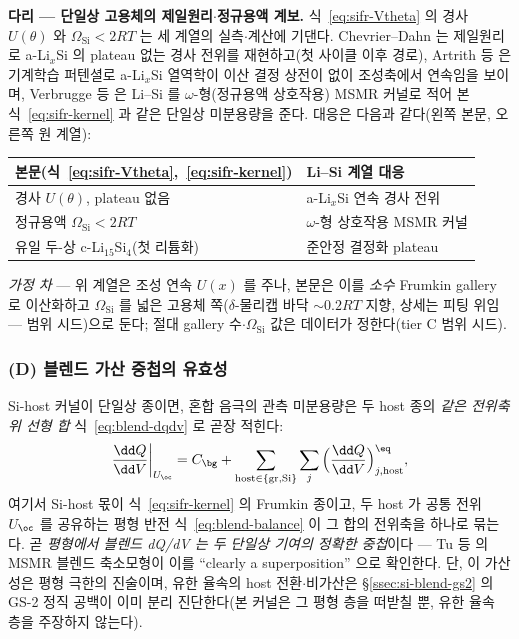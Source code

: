 \begin{srcbox}
\textbf{다리 --- 단일상 고용체의 제일원리$\cdot$정규용액 계보.} 식~\eqref{eq:sifr-Vtheta} 의 경사 $U(\theta)$
와 $\Omega_\mathrm{Si}<2RT$ 는 세 계열의 실측$\cdot$계산에 기댄다. Chevrier--Dahn\cite{chevrier_dahn2009} 는
제일원리로 a-Li$_x$Si 의 plateau 없는 경사 전위를 재현하고(첫 사이클 이후 경로), Artrith
등\cite{artrith2018} 은 기계학습 퍼텐셜로 a-Li$_x$Si 열역학이 이산 결정 상전이 없이 조성축에서 연속임을
보이며, Verbrugge 등\cite{verbrugge2017} 은 Li--Si 를 $\omega$-형(정규용액 상호작용) MSMR 커널로 적어 본
식~\eqref{eq:sifr-kernel} 과 같은 단일상 미분용량을 준다. 대응은 다음과 같다(왼쪽 본문, 오른쪽 원 계열):
\begin{center}\footnotesize
\begin{tabular}{@{}ll@{}}
\hline
본문(식~\eqref{eq:sifr-Vtheta},~\eqref{eq:sifr-kernel}) & Li--Si 계열 대응 \\
\hline
경사 $U(\theta)$, plateau 없음 & a-Li$_x$Si 연속 경사 전위\cite{chevrier_dahn2009,artrith2018} \\
정규용액 $\Omega_\mathrm{Si}<2RT$ & $\omega$-형 상호작용 MSMR 커널\cite{verbrugge2017} \\
유일 두-상 c-Li$_{15}$Si$_4$(첫 리튬화) & 준안정 결정화 plateau\cite{obrovac_christensen2004} \\
\hline
\end{tabular}
\end{center}
\emph{가정 차} --- 위 계열은 조성 연속 $U(x)$ 를 주나, 본문은 이를 \emph{소수} Frumkin gallery 로 이산화하고
$\Omega_\mathrm{Si}$ 를 넓은 고용체 쪽($\delta$-물리캡 바닥 $\sim0.2RT$ 지향, 상세는 피팅 위임 --- 범위 시드)으로
둔다; 절대 gallery 수$\cdot$$\Omega_\mathrm{Si}$ 값은 데이터가 정한다(tier C 범위 시드).
\end{srcbox}

\subsubsection*{(D) 블렌드 가산 중첩의 유효성}
Si-host 커널이 단일상 종이면, 혼합 음극의 관측 미분용량은 두 host 종의 \emph{같은 전위축 위 선형 합}
식~\eqref{eq:blend-dqdv} 로 곧장 적힌다:
\begin{equation}
\frac{\dd Q}{\dd V}\bigg|_{U_\oc}=C_\bg+\sum_{\mathrm{host}\in\{\mathrm{gr},\mathrm{Si}\}}\sum_{j}
\Big(\frac{\dd Q}{\dd V}\Big)^{\eq}_{j,\mathrm{host}},
\label{eq:sifr-super}
\end{equation}
여기서 Si-host 몫이 식~\eqref{eq:sifr-kernel} 의 Frumkin 종이고, 두 host 가 공통 전위 $U_\oc$ 를 공유하는
평형 반전 식~\eqref{eq:blend-balance} 이 그 합의 전위축을 하나로 묶는다. 곧 \emph{평형에서 블렌드 dQ/dV 는
두 단일상 기여의 정확한 중첩}이다 --- Tu 등\cite{tu_blend2024} 의 MSMR 블렌드 축소모형이 이를 ``clearly a
superposition'' 으로 확인한다. 단, 이 가산성은 평형 극한의 진술이며, 유한 율속의 host 전환$\cdot$비가산은
\S\ref{ssec:si-blend-gs2} 의 GS-2 정직 공백이 이미 분리 진단한다(본 커널은 그 평형 층을 떠받칠 뿐, 유한 율속
층을 주장하지 않는다).

